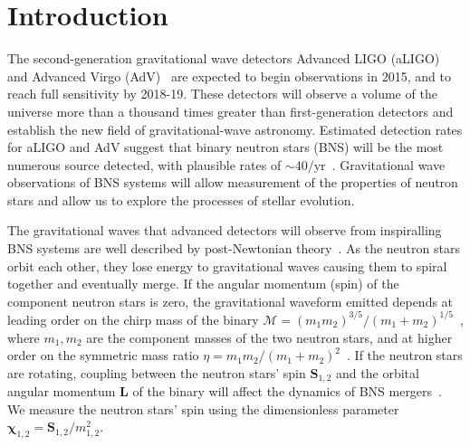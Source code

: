 \maketitle

\section{Introduction}

The second-generation gravitational wave detectors Advanced LIGO (aLIGO) and
Advanced Virgo (AdV)~\cite{Harry:2010zz, aVirgo} are expected to begin
observations in 2015, and to reach full sensitivity by 2018-19. These detectors
will observe a volume of the universe more than a thousand times greater than
first-generation detectors and establish the new field of gravitational-wave
astronomy. Estimated detection rates for aLIGO and AdV suggest that binary
neutron stars (BNS) will be the most numerous source detected, with plausible
rates of $\sim 40/\mathrm{yr}$~\cite{Abadie:2010cf}.
Gravitational wave
observations of BNS systems will allow measurement of the properties of
neutron stars and allow us to explore the processes of stellar evolution.

The gravitational waves that advanced detectors will observe from inspiralling BNS systems
are well described by post-Newtonian theory~\cite{Blanchet:2006zz}.
As the neutron stars orbit each other, they lose energy to gravitational waves
causing them to spiral together and eventually merge.
If the
angular momentum (spin) of the component neutron stars is zero, the gravitational
waveform emitted depends at leading order on the chirp mass of the binary
$\mathcal{M} = \left(m_1 m_2\right)^{3/5}/\left( m_1 +
m_2\right)^{1/5}$~\cite{Peters:1963ux}, where $m_1,m_2$ are the component masses
of the two neutron stars, and at higher order on the symmetric
mass ratio $\eta = m_1 m_2 /
(m_1+m_2)^2$~\cite{Blanchet:1995fg,Blanchet:1995ez,BIWW96,Wi93,BFIJ02,Blanchet:2004ek}.
If the neutron stars are rotating, 
coupling between the neutron stars' spin $\bm{S}_{1,2}$ and the
orbital angular momentum $\bm{L}$ of the binary will affect the dynamics of BNS
mergers~\cite{Kidder:1992fr,Apostolatos:1994mx,Kidder:1995zr,Blanchet:2006gy}.  
We measure the neutron stars' spin using the dimensionless parameter
$\bm{\chi}_{1,2} = {\bm{S}_{1,2}}/{m_{1,2}^2}$.

